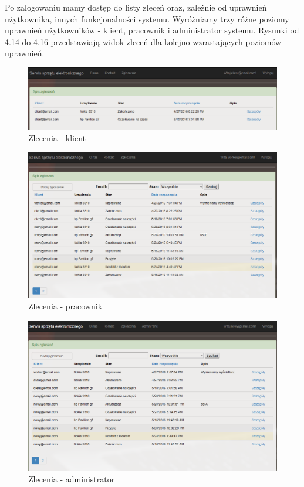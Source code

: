 \documentclass[a4paper,11pt]{article}
\begin{document}
Po zalogowaniu mamy dostęp do listy zleceń oraz, zależnie od uprawnień użytkownika, innych funkcjonalności systemu. Wyróżniamy trzy różne poziomy uprawnień użytkowników - klient, pracownik i administrator systemu. Rysunki od 4.14 do 4.16 przedstawiają widok zleceń dla kolejno wzrastających poziomów uprawnień.

\begin{figure}[h!]
	\centering
	\includegraphics[width=\textwidth,height=0.3\textheight]{serwisKlient.png}
	\caption{Zlecenia - klient}
\end{figure}
\begin{figure}[h!]
	\centering
	\includegraphics[width=\textwidth,height=0.6\textheight]{serwisWorker.png}
	\caption{Zlecenia - pracownik}
\end{figure}
\begin{figure}[h!]
	\centering
	\includegraphics[width=\textwidth,height=0.6\textheight]{serwisZlecenia.png}
	\caption{Zlecenia - administrator}
\end{figure}
\end{document}
